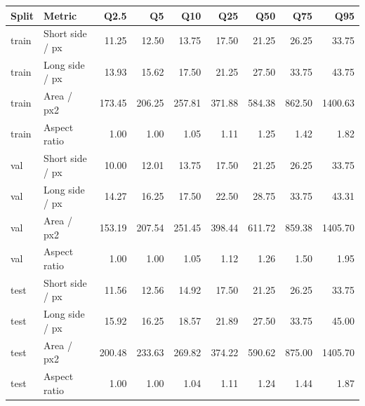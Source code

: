 \begin{tabular}{llrrrrrrr}
\toprule
Split & Metric & Q2.5 & Q5 & Q10 & Q25 & Q50 & Q75 & Q95 \\
\midrule
train & Short side / px & 11.25 & 12.50 & 13.75 & 17.50 & 21.25 & 26.25 & 33.75 \\
train & Long side / px & 13.93 & 15.62 & 17.50 & 21.25 & 27.50 & 33.75 & 43.75 \\
train & Area / px2 & 173.45 & 206.25 & 257.81 & 371.88 & 584.38 & 862.50 & 1400.63 \\
train & Aspect ratio & 1.00 & 1.00 & 1.05 & 1.11 & 1.25 & 1.42 & 1.82 \\
val & Short side / px & 10.00 & 12.01 & 13.75 & 17.50 & 21.25 & 26.25 & 33.75 \\
val & Long side / px & 14.27 & 16.25 & 17.50 & 22.50 & 28.75 & 33.75 & 43.31 \\
val & Area / px2 & 153.19 & 207.54 & 251.45 & 398.44 & 611.72 & 859.38 & 1405.70 \\
val & Aspect ratio & 1.00 & 1.00 & 1.05 & 1.12 & 1.26 & 1.50 & 1.95 \\
test & Short side / px & 11.56 & 12.56 & 14.92 & 17.50 & 21.25 & 26.25 & 33.75 \\
test & Long side / px & 15.92 & 16.25 & 18.57 & 21.89 & 27.50 & 33.75 & 45.00 \\
test & Area / px2 & 200.48 & 233.63 & 269.82 & 374.22 & 590.62 & 875.00 & 1405.70 \\
test & Aspect ratio & 1.00 & 1.00 & 1.04 & 1.11 & 1.24 & 1.44 & 1.87 \\
\bottomrule
\end{tabular}
